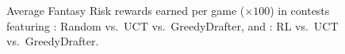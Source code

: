 \documentclass[letterpaper]{article}
\numberwithin{equation}{section}
\numberwithin{theorem}{section}
\numberwithin{lemma}{section}
\numberwithin{df}{section}
\begin{document}
\begin{figure}[t]
\centering
{}\hspace{5pt}
\caption[]{Average Fantasy Risk rewards earned per game ($\times 100$) in contests featuring : Random vs.~UCT vs.~GreedyDrafter, and : RL vs.~UCT vs.~GreedyDrafter.}
\label{fig:FantRisk1}
\end{figure}  
\end{document}
